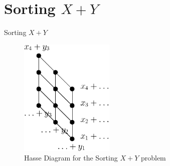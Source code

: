 \section{Sorting $X+Y$}
\begin{frame}[c]{Sorting $X+Y$}
\begin{figure}[hbtp]
\centering
\includegraphics[width=0.4\textwidth]{fig/x+y}
\caption{Hasse Diagram for the Sorting $X+Y$ problem}
\end{figure}
\end{frame}